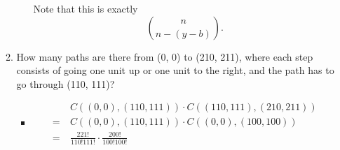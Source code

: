 \documentclass{article}
\begin{document}
\begin{enumerate}
\begin{enumerate}
\begin{itemize}
$$					$$
					Note that this is exactly
					$$
					\binom{n}{n - (y - b)}.
					$$
				\end{itemize}
			\item How many paths are there from (0, 0) to (210, 211), where each step consists of going one unit up or one unit to the right, and the path has to go through (110, 111)?
				\begin{itemize}
					\item
					$$
					\begin{aligned}
					&\ C((0, 0), (110, 111)) \cdot C((110, 111), (210, 211)) \\
					=&\ C((0, 0), (110, 111)) \cdot C((0, 0), (100, 100)) \\
					=&\ \frac{221!}{110!111!} \cdot \frac{200!}{100!100!}
					\end{aligned}
					$$
				\end{itemize}
		\end{enumerate}
\end{enumerate}
\end{document}
